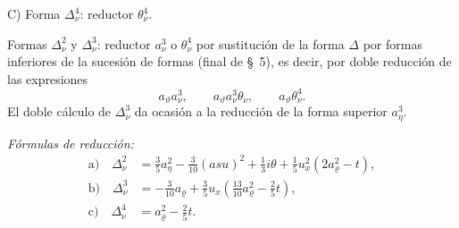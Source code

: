 \documentclass[11pt]{article}
\newcommand{\A}{\Delta}
\newcommand{\R}{\varrho}
\begin{document}
\noindent C) Forma $\A_\nu^4$: reductor $\theta_\nu^4$.

Formas $\A_\nu^2$ y $\A_\nu^3$: reductor $a_\nu^3$ o $\theta_\nu^4$ por sustitución de la forma $\A$ por formas inferiores de la sucesión de formas (final de \S\ 5), es decir, por doble reducción de las expresiones
\[
a_\vartheta a_\nu^3,
\qquad a_\vartheta a_\nu^3\theta_\nu,
\qquad a_\vartheta\theta_\nu^4.
\]
El doble cálculo de $\A_\nu^3$ da ocasión a la reducción de la forma superior $a_\eta^3$.

\noindent\emph{Fórmulas de reducción:}
\[
\tag{10}
\begin{aligned}
\text{a)}\quad \A_\nu^2
&=\frac35a_\eta^2-\frac3{10}(asu)^2+\frac13 i\theta
+\frac15u_x^2(2a_\R^2-t),\\
\text{b)}\quad \A_\nu^3
&=-\frac3{10}a_\R+\frac35u_x\left(\frac{13}{10}a_\R^2-\frac25t\right),\\
\text{c)}\quad \A_\nu^4&=a_\R^2-\frac25t.
\end{aligned}
\]
\end{document}
